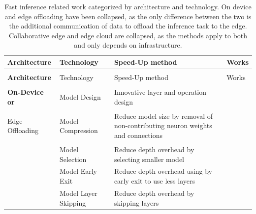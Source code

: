 \begin{minipage}[t]{\linewidth}
\begin{footnotesize}
\begin{longtabu}{>{\bfseries}X[c]|X[l]|X[3l]|X[c]}
	\caption[Fast Inference Related Work]{Fast inference related work categorized by architecture and technology. On device and edge offloading have been collapsed, as the only difference between the two is the additional communication of data to offload the inference task to the edge. Collaborative edge and edge cloud are collapsed, as the methods apply to both and only depends on infrastructure.} \label{tbl:fast-inference} \\
	\toprule
	\rowfont{\bfseries}
	Architecture & Technology & Speed-Up method & Works \tabularnewline
	\hline
	\endfirsthead
	\\
	\toprule
	\rowfont{\bfseries}
	Architecture & Technology & Speed-Up method & Works \tabularnewline
	\hline
	\endhead %
	\hline
	\\
	\endfoot
	\hline
	\endlastfoot
	On-Device or & Model Design & Innovative layer and operation design & \cite{iandola_squeezenet:_2016,howard_mobilenets:_2017,sandler_mobilenetv2:_2018, zhang_shufflenet:_2017, ma_shufflenet_2018} \tabularnewline
	
	Edge Offloading & Model Compression & Reduce model size by removal of non-contributing neuron weights and connections &  \cite{hinton_distilling_2015,courbariaux_binaryconnect:_2015,courbariaux_binarized_2016,romero_fitnets:_2014} \tabularnewline	
	
	& Model Selection & Reduce depth overhead by selecting smaller model%
	& \cite{bolukbasi_adaptive_2017, tann_flexible_2018, park_big/little_2015} \tabularnewline
	
	& Model Early Exit & Reduce depth overhead using by early exit to use less layers%
	& \cite{leroux_resource-constrained_2015,teerapittayanon_branchynet:_2016, berestizshevsky_sacrificing_2019, kaya_shallow-deep_nodate, huang_multi-scale_2017} \tabularnewline
	& Model Layer Skipping & Reduce depth overhead by skipping layers %
	& \cite{wang_skipnet:_2017,wu_blockdrop:_2017} \tabularnewline\hline
		

\end{longtabu}
\end{footnotesize}
\end{minipage}
